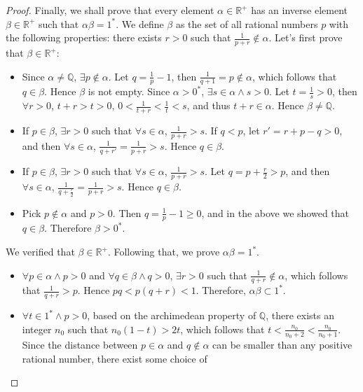 \documentclass{article}
\begin{document}
\begin{proof}
  Finally, we shall prove that every element $\alpha \in \mathbb{R^+}$ has an 
  inverse element $\beta \in \mathbb{R^+}$ such that $\alpha \beta = 1^*$. We 
  define $\beta$ as the set of all rational numbers $p$ with the following 
  properties: there exists $r > 0$ such that $\frac{1}{p + r} \notin \alpha$. 
  Let's first prove that $\beta \in \mathbb{R^+}$:
  \begin{itemize}
    \item Since $\alpha \neq \mathbb{Q}$, $\exists p \notin \alpha$. Let 
    $q = \frac{1}{p} - 1$, then $\frac{1}{q + 1} = p \notin \alpha$, which 
    follows that $q \in \beta$. Hence $\beta$ is not empty. Since $\alpha > 0^*$, 
    $\exists s \in \alpha \wedge s > 0$. Let $t = \frac{1}{s} > 0$, then 
    $\forall r > 0$, $t + r > t > 0$, $0 < \frac{1}{t + r} < \frac{1}{t} < s$, 
    and thus $t + r \in \alpha$. Hence $\beta \neq \mathbb{Q}$.
    \item If $p \in \beta$, $\exists r > 0$ such that $\forall s \in \alpha$, 
    $\frac{1}{p + r} > s$. If $q < p$, let $r' = r + p - q > 0$, and then 
    $\forall s \in \alpha$, $\frac{1}{q + r'} = \frac{1}{p + r} > s$. Hence 
    $q \in \beta$.
    \item If $p \in \beta$, $\exists r > 0$ such that $\forall s \in \alpha$, 
    $\frac{1}{p + r} > s$. Let $q = p + \frac{r}{2} > p$, and then 
    $\forall s \in \alpha$, $\frac{1}{q + \frac{r}{2}} = \frac{1}{p + r} > s$. 
    Hence $q \in \beta$.
    \item Pick $p \notin \alpha$ and $p > 0$. Then $q = \frac{1}{p} - 1 \geq 0$, 
    and in the above we showed that $q \in \beta$. Therefore $\beta > 0^*$.
  \end{itemize}
  We verified that $\beta \in \mathbb{R^+}$. Following that, we prove 
  $\alpha \beta = 1^*$.
  \begin{itemize}
    \item $\forall p \in \alpha \wedge p > 0$ and 
    $\forall q \in \beta \wedge q > 0$, $\exists r > 0$ such that 
    $\frac{1}{q + r} \notin \alpha$, which follows that $\frac{1}{q + r} > p$. 
    Hence $pq < p (q + r) < 1$. Therefore, $\alpha \beta \subset 1^*$.
    \item $\forall t \in 1^* \wedge p > 0$, based on the archimedean property of 
    $\mathbb{Q}$, there exists an integer $n_0$ such that $n_0(1 - t) > 2t$, 
    which follows that $t < \frac{n_0}{n_0+2} < \frac{n_0}{n_0+1}$. Since the 
    distance between $p \in \alpha$ and $q \notin \alpha$ can be smaller than 
    any positive rational number, there exist some choice of 

\end{itemize}
\end{proof}
\end{document}
